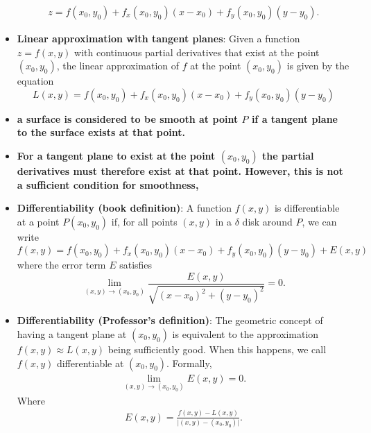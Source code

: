 \documentclass{report}
\begin{document}
\begin{itemize}
                \begin{align*}
                    z = f(x_0, y_0) + f_x(x_0, y_0)(x - x_0) + f_y(x_0, y_0)(y - y_0)
                .\end{align*}
            \item \textbf{Linear approximation with tangent planes}: 
                Given a function \(z=f(x,y)\) with continuous partial derivatives that exist at the point \((x_0,y_0)\), the linear approximation of \(f\) at the point \((x_0,y_0)\) is given by the equation
                \[ L(x,y) = f(x_0,y_0) + f_x(x_0,y_0)(x-x_0) + f_y(x_0,y_0)(y-y_0) \]
            \item \textbf{a surface is considered to be smooth at point  $P$ if a tangent plane to the surface exists at that point.}
            \item \textbf{For a tangent plane to exist at the point  $(x_{0}, y_{0})$ the partial derivatives must therefore exist at that point. However, this is not a sufficient condition for smoothness,}
            \item \textbf{Differentiability (book definition)}: A function \(f(x,y)\) is differentiable at a point \(P(x_0,y_0)\) if, for all points \((x,y)\) in a \(\delta\) disk around \(P\), we can write
                \begin{equation}
                    f(x,y) = f(x_0,y_0) + f_x(x_0,y_0)(x-x_0) + f_y(x_0,y_0)(y-y_0) + E(x,y)
                \end{equation}
                where the error term \(E\) satisfies
                \[
                    \lim_{(x,y) \to (x_0,y_0)} \frac{E(x,y)}{\sqrt{(x-x_0)^2 + (y-y_0)^2}} = 0.
                \]
            \item \textbf{Differentiability (Professor's definition)}: The geometric concept of having a tangent plane at $(x_{0}, y_{0})$ is equivalent to the approximation $f(x,y) \approx L(x,y)$ being sufficiently good. When this happens, we call $f(x,y)$ differentiable at $(x_{0}, y_{0})$. Formally,
                \begin{align*}
                    \lim\limits_{(x,y) \to (x_{0}, y_{0})}{E(x,y)} = 0
                .\end{align*}
                Where 
                \begin{align*}
                    E(x,y) = \frac{f(x,y) - L(x,y)}{\bigg\lvert (x,y) - (x_{0}, y_{0}) \bigg\rvert}
                .\end{align*}


\end{itemize}
\end{document}
